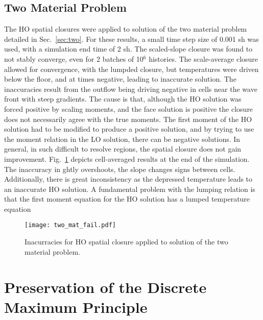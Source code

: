 \subsection{Two Material Problem}

The HO spatial closures were applied to solution of the two material problem detailed in Sec.~\ref{sec:two}.
For these results, a small time step size of 0.001 sh was used, with a simulation end time
of 2 sh.  The scaled-slope closure was found to not stably converge, even for 2 batches of 10$^6$
histories.  The scale-average closure allowed for convergence, with the lumpded closure, but temperatures were driven
below the floor, and at times negative, leading to inaccurate solution.  The inaccuracies
result from the outflow being driving negative in cells near the wave front with steep
gradients.  The cause is that, although the HO solution was forced positive by scaling
moments, and the face solution is positive the closure does not necessarily agree with the
true moments. The first moment of the HO solution had to be modified to produce a positive
solution, and by trying to use the moment relation in the LO solution, there can be
negative solutions.  In general, in such difficult to resolve regions, the spatial closure
does not gain improvement.
Fig.~\ref{fig:two_mat_fail} depicts cell-averaged results at the end of the simulation.
The inaccuracy in ghtly overshoots, the slope changes signs between cells.  Additionally,
there is great inconsistency as the depressed temperature leads to an inaccurate HO solution.
A fundamental problem with the lumping relation is that the first moment equation for the
HO solution has a lumped temperature equation
\begin{figure}[H]
    \centering
    \texttt{[image: two\_mat\_fail.pdf]}
    \caption{\label{fig:two_mat_fail}Inacurracies for HO spatial closure applied to
    solution of the two material problem.}
\end{figure}




\section{Preservation of the Discrete Maximum Principle}

